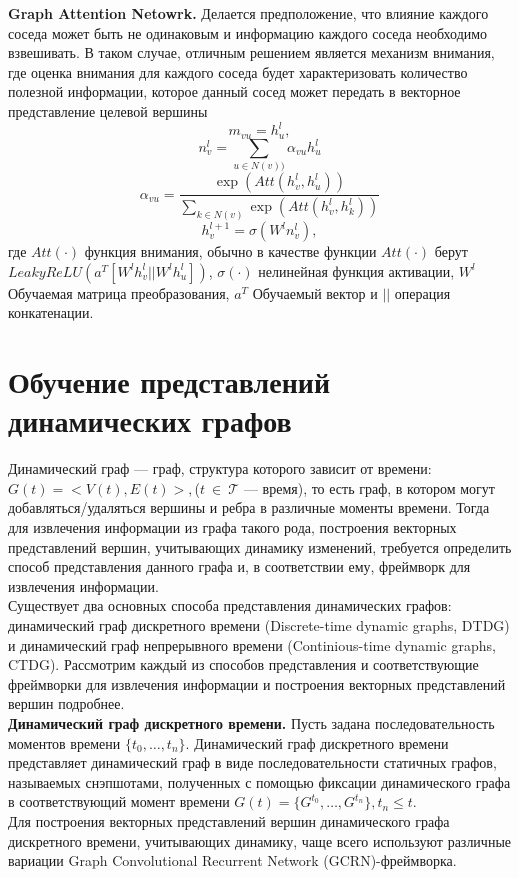 \documentclass{mipt-thesis-ms}
\renewcommand{\leq}{\leqslant}  %
\begin{document}
{\bf Graph Attention Netowrk.} Делается предположение, что влияние каждого соседа может быть не одинаковым и информацию каждого соседа необходимо взвешивать. В таком случае, отличным решением является механизм внимания, где оценка внимания для каждого соседа будет характеризовать количество полезной информации, которое данный сосед может передать в векторное представление целевой вершины
$$m_{vu} = h_u^l,$$
$$n_v^l = \sum_{u \in N(v))}\alpha_{vu}h_u^l$$
$$\alpha_{vu} = \frac{\exp({Att}(h_v^l, h_u^l))}{\sum_{k \in N(v)} \exp({Att}(h_v^l, h_k^l))}$$
$$h_v^{l+1} = \sigma\left(W^l n_v^l\right),$$
где ${Att}(\cdot)$ функция внимания, обычно в качестве функции ${Att}(\cdot)$ берут ${LeakyReLU}(a^T[W^lh_v^l||W^lh_u^l])$, $\sigma(\cdot)$ нелинейная функция активации, $W^l$ Обучаемая матрица преобразования, $a^T$ Обучаемый вектор и $||$ операция конкатенации.

\section{Обучение представлений динамических графов}
Динамический граф --- граф, структура которого зависит от времени: $G(t) = <V(t), E(t)>,$($t~\in~\mathcal{T}$ --- время), то есть граф, в котором могут добавляться/удаляться вершины и ребра в различные моменты времени. Тогда для извлечения информации из графа такого рода, построения векторных представлений вершин, учитывающих динамику изменений, требуется определить способ представления данного графа и, в соответствии ему, фреймворк для извлечения информации.\\

Существует два основных способа представления динамических графов: динамический граф дискретного времени (Discrete-time dynamic graphs, DTDG) и динамический граф непрерывного времени (Continious-time dynamic graphs, CTDG). Рассмотрим каждый из способов представления и соответствующие фреймворки для извлечения информации и построения векторных представлений вершин подробнее.\\

{\bf Динамический граф дискретного времени.} Пусть задана последовательность моментов времени $\{t_0, \dots, t_n\}$. Динамический граф дискретного времени представляет динамический граф в виде последовательности статичных графов, называемых снэпшотами, полученных с помощью фиксации динамического графа в соответствующий момент времени $G(t) = \{G^{t_0}, \dots, G^{t_n}\}, t_n \leq t$.\\

Для построения векторных представлений вершин динамического графа дискретного времени, учитывающих динамику, чаще всего используют различные вариации Graph Convolutional Recurrent Network (GCRN)-фреймворка.\\
\end{document}
